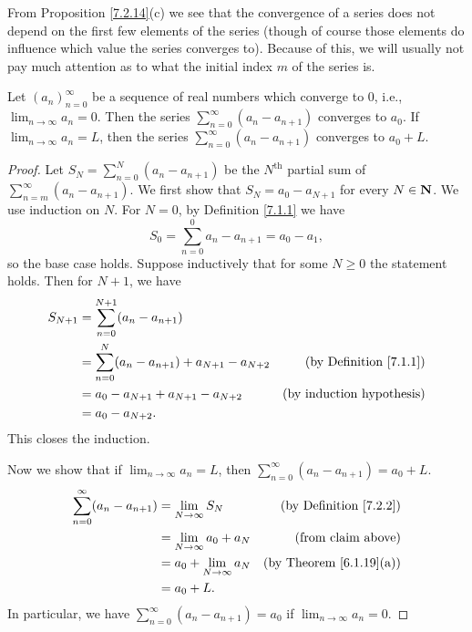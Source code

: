 \begin{note}
    From Proposition \ref{7.2.14}(c) we see that the convergence of a series does not depend on the first few elements of the series
    (though of course those elements do influence which value the series converges to).
    Because of this, we will usually not pay much attention as to what the initial index \(m\) of the series is.
\end{note}

\begin{lemma}\label{7.2.15}
    Let \((a_n)_{n = 0}^\infty\) be a sequence of real numbers which converge to \(0\), i.e., \(\lim_{n \to \infty} a_n = 0\).
    Then the series \(\sum_{n = 0}^\infty (a_n - a_{n + 1})\) converges to \(a_0\).
    If \(\lim_{n \to \infty} a_n = L\), then the series \(\sum_{n = 0}^\infty (a_n - a_{n + 1})\) converges to \(a_0 + L\).
\end{lemma}

\begin{proof}
    Let \(S_N = \sum_{n = 0}^N (a_n - a_{n + 1})\) be the \(N^{\text{th}}\) partial sum of \(\sum_{n = m}^\infty (a_n - a_{n + 1})\).
    We first show that \(S_N = a_0 - a_{N + 1}\) for every \(N \in \mathbf{N}\).
    We use induction on \(N\).
    For \(N = 0\), by Definition \ref{7.1.1} we have
    \[
        S_0 = \sum_{n = 0}^0 a_n - a_{n + 1} = a_0 - a_1,
    \]
    so the base case holds.
    Suppose inductively that for some \(N \geq 0\) the statement holds.
    Then for \(N + 1\), we have
    \begin{align*}
        S_{N + 1} & = \sum_{n = 0}^{N + 1} (a_n - a_{n + 1})                                                        \\
                  & = \sum_{n = 0}^N (a_n - a_{n + 1}) + a_{N + 1} - a_{N + 2} & \text{(by Definition \ref{7.1.1})} \\
                  & = a_0 - a_{N + 1} + a_{N + 1} - a_{N + 2}                  & \text{(by induction hypothesis)}   \\
                  & = a_0 - a_{N + 2}.
    \end{align*}
    This closes the induction.

    Now we show that if \(\lim_{n \to \infty} a_n = L\), then \(\sum_{n = 0}^\infty (a_n - a_{n + 1}) = a_0 + L\).
    \begin{align*}
        \sum_{n = 0}^\infty (a_n - a_{n + 1}) & = \lim_{N \to \infty} S_N       & \text{(by Definition \ref{7.2.2})}  \\
                                              & = \lim_{N \to \infty} a_0 + a_N & \text{(from claim above)}           \\
                                              & = a_0 + \lim_{N \to \infty} a_N & \text{(by Theorem \ref{6.1.19}(a))} \\
                                              & = a_0 + L.
    \end{align*}
    In particular, we have \(\sum_{n = 0}^\infty (a_n - a_{n + 1}) = a_0\) if \(\lim_{n \to \infty} a_n = 0\).
\end{proof}

